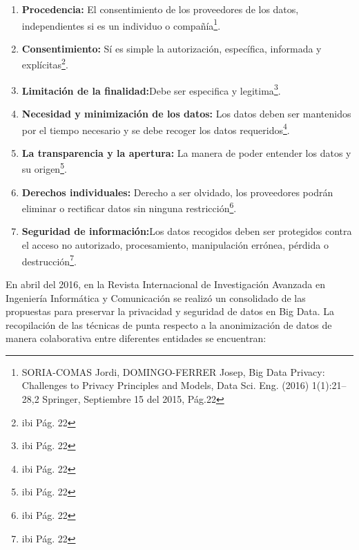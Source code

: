 \documentclass[a4paper,openright,12pt]{book}
\theoremstyle{definition}
\theoremstyle{remark}
\begin{document}
\begin{enumerate}
	\item \textbf{Procedencia:} El consentimiento de los proveedores de los datos, independientes si es un individuo o compañía\footnote{SORIA-COMAS Jordi, DOMINGO-FERRER Josep, 
Big Data Privacy: Challenges to Privacy Principles and Models, Data Sci. Eng. (2016) 1(1):21–28,2 Springer, Septiembre 15 del 2015, Pág.22}.
    \item \textbf{Consentimiento:} Sí es simple la autorización, específica, informada y explícitas\footnote{ibi Pág. 22}.
    \item \textbf{Limitación de la finalidad:}Debe ser especifica y legitima\footnote{ibi Pág. 22}.
    \item \textbf{Necesidad y minimización de los datos:} Los datos deben ser mantenidos por el tiempo necesario y se debe recoger los datos requeridos\footnote{ibi Pág. 22}.
    \item \textbf{La transparencia y la apertura:} La manera de poder entender los datos y su origen\footnote{ibi Pág. 22}.
    \item \textbf{Derechos individuales:} Derecho a ser olvidado, los proveedores podrán eliminar o rectificar datos sin ninguna restricción\footnote{ibi Pág. 22}.
    \item \textbf{Seguridad de información:}Los datos recogidos deben ser protegidos contra el acceso no autorizado, procesamiento, manipulación errónea, pérdida o destrucción\footnote{ibi Pág. 22}.
\end{enumerate}
En abril del 2016, en la Revista Internacional de Investigación Avanzada en Ingeniería Informática y Comunicación se realizó un consolidado de las propuestas para preservar la privacidad y seguridad de datos en Big Data. La recopilación de las técnicas de punta respecto a la anonimización de datos de manera colaborativa entre diferentes entidades se encuentran:
\end{document}
